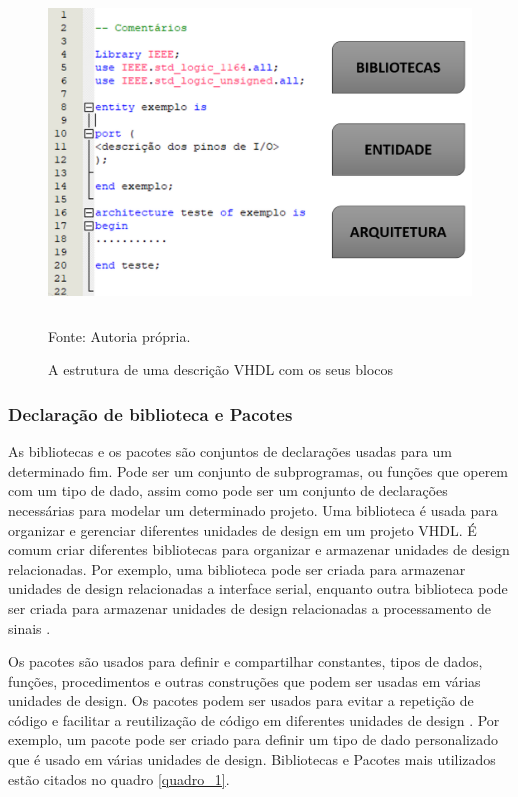 \begin{figure}[!htb]
    \centering
    \caption{A estrutura de uma descrição VHDL com os seus blocos}
    \includegraphics[height = 9cm]{figuras/estrut_blocVHDL.png}\\
    {\footnotesize Fonte: Autoria própria.}
    \label{fig:vhdl_blocos_estrut}
\end{figure}
 
\subsubsection{Declaração de biblioteca e Pacotes}

As bibliotecas e os pacotes são conjuntos de declarações usadas para um determinado fim. Pode ser um conjunto de subprogramas, ou funções que operem com um tipo de dado, assim como pode ser um conjunto de declarações necessárias para modelar um determinado projeto. Uma biblioteca é usada para organizar e gerenciar diferentes unidades de design em um projeto VHDL. É comum criar diferentes bibliotecas para organizar e armazenar unidades de design relacionadas. Por exemplo, uma biblioteca pode ser criada para armazenar unidades de design relacionadas a interface serial, enquanto outra biblioteca pode ser criada para armazenar unidades de design relacionadas a processamento de sinais \cite{roth2004circuit}.

Os pacotes são usados para definir e compartilhar constantes, tipos de dados, funções, procedimentos e outras construções que podem ser usadas em várias unidades de design. Os pacotes podem ser usados para evitar a repetição de código e facilitar a reutilização de código em diferentes unidades de design \cite{ordonez2003projeto}. Por exemplo, um pacote pode ser criado para definir um tipo de dado personalizado que é usado em várias unidades de design. 
Bibliotecas e Pacotes mais utilizados estão citados no quadro \ref{quadro_1}.

